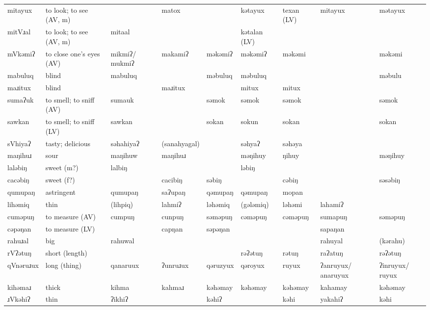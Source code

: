 \begin{landscape}
\begin{longtable}{*{9}{>{\raggedright\arraybackslash}p{}}}
\text{*}mitayux & to look; to see (AV, m) &  & matox &  & kətayux & texan (LV) & mitayux & mətayux\\
\text{*}mitVɹal & to look; to see (AV, m) & mitaal &  &  & kətalan (LV) &  &  & \\
\text{*}mVkəmiʔ & to close one's eyes (AV) & mikmiʔ/ \newline mukmiʔ & makamiʔ & məkəmiʔ & məkəmiʔ & məkəmi &  & məkəmi\\
\text{*}mabuluq & blind & mabuluq &  & məbuluq & məbuluq &  &  & məbulu\\
\text{*}maɹitux & blind &  & maɹitux &  & mitux & mitux &  & \\
\text{*}sumaʔuk & to smell; to sniff (AV) & sumauk &  & səmok & səmok & səmok &  & səmok\\
\text{*}sawkan & to smell; to sniff (LV) & sawkan &  & sokan & sokun & sokan &  & sokan\\
\text{*}sVhiyaʔ & tasty; delicious & səhahiyaʔ & (sanahyagal) &  & səhyaʔ & səhəya &  & \\
\text{*}maŋihuɹ & sour & maŋihuw & maŋihuɹ &  & məŋihuy & ŋihuy &  & məŋihuy\\
\text{*}laləbiŋ & sweet (m?) & lalbiŋ &  &  & ləbiŋ &  &  & \\
\text{*}cacəbiŋ & sweet (f?) &  & cacibiŋ & səbiŋ &  & cəbiŋ &  & səsəbiŋ\\
\text{*}qumupaŋ & astringent & qumupaŋ & saʔupaŋ & qəmupaŋ & qəmupaŋ & mopan &  & \\
\text{*}lihəmiq & thin & (lihpiq) & lahmiʔ & ləhəmiq & (gələmiq) & ləhəmi & lahamiʔ & \\
\text{*}cuməpuŋ & to measure (AV) & cumpuŋ & cunpuŋ & səməpuŋ & cəməpuŋ & cəməpuŋ & sumapuŋ & səməpuŋ\\
\text{*}cəpəŋan & to measure (LV) &  & capŋan & səpəŋan &  &  & sapaŋan & \\
\text{*}rahuɹal & big & rahuwal &  &  &  &  & rahuyal & (kərahu)\\
\text{*}rVʔətuŋ & short (length) &  &  &  & rəʔətuŋ & rətuŋ & raʔatuŋ & rəʔətuŋ\\
\text{*}qVnəruɹux & long (thing) & qanaruux & ʔunruɹux & qəruzyux & qəroyux & ruyux & ʔanruyux/ \newline anaruyux & ʔinruyux/ \newline ruyux\\
\text{*}kihəmaɹ & thick & kihma & kahmaɹ & kəhəmay & kəhəmay & kəhəmay & kahamay & kəhəmay\\
\text{*}ɹVkəhiʔ & thin & ʔikhiʔ &  & kəhiʔ &  & kəhi & yakahiʔ & kəhi\\

\end{longtable}
\end{landscape}
